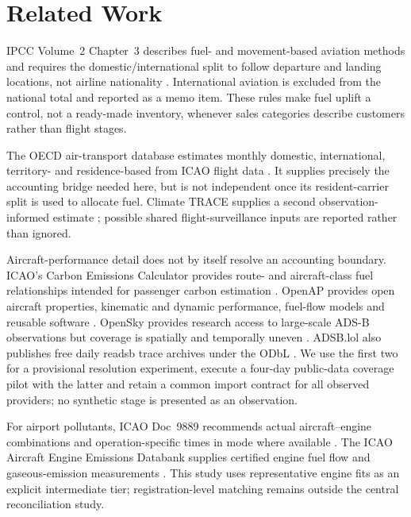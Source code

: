 \section{Related Work}
\label{sec:related}

IPCC Volume~2 Chapter~3 describes fuel- and movement-based aviation methods and requires the
domestic/international split to follow departure and landing locations, not airline nationality
\citep{ipcc2006energy}. International aviation is excluded from the national total and reported
as a memo item. These rules make fuel uplift a control, not a ready-made inventory, whenever
sales categories describe customers rather than flight stages.

The OECD air-transport database estimates monthly domestic, international, territory- and
residence-based \COtwo{} from ICAO flight data \citep{oecdaviation}. It supplies precisely the
accounting bridge needed here, but is not independent once its resident-carrier split is used
to allocate fuel. Climate TRACE supplies a second observation-informed estimate
\citep{climatetrace}; possible shared flight-surveillance inputs are reported rather than
ignored.

Aircraft-performance detail does not by itself resolve an accounting boundary. ICAO's Carbon
Emissions Calculator provides route- and aircraft-class fuel relationships intended for
passenger carbon estimation \citep{icaoicec2024}. OpenAP provides open aircraft properties,
kinematic and dynamic performance, fuel-flow models and reusable software
\citep{sun2020openap}. OpenSky provides research access to large-scale ADS-B observations but
coverage is spatially and temporally uneven \citep{schaefer2014opensky}. ADSB.lol also publishes
free daily readsb trace archives under the ODbL \citep{adsblolhistory,readsbjson}. We use the
first two for a provisional resolution experiment, execute a four-day public-data coverage
pilot with the latter and retain a common import contract for all observed providers; no
synthetic stage is presented as an observation.

For airport pollutants, ICAO Doc~9889 recommends actual aircraft--engine combinations and
operation-specific times in mode where available \citep{icao9889}. The ICAO Aircraft Engine
Emissions Databank supplies certified engine fuel flow and gaseous-emission measurements
\citep{icaoeedb}. This study uses representative engine fits as an explicit intermediate tier;
registration-level matching remains outside the central reconciliation study.
